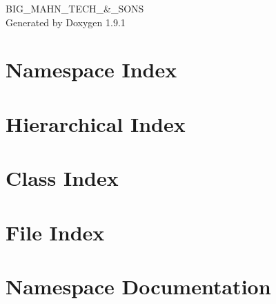 \let\mypdfximage\pdfximage\def\pdfximage{\immediate\mypdfximage}\documentclass[twoside]{book}
\newcommand{\+}{\discretionary{\mbox{\scriptsize$\hookleftarrow$}}{}{}}
\newcommand{\clearemptydoublepage}{%
  \newpage{\pagestyle{empty}\cleardoublepage}%
}
\begin{document}
\raggedbottom

\hypersetup{pageanchor=false,
             bookmarksnumbered=true,
             pdfencoding=unicode
            }
\begin{titlepage}
\vspace*{7cm}
\begin{center}%
{\Large BIG\+\_\+\+MAHN\+\_\+\+TECH\+\_\+\&\+\_\+\+SONS }\\
\vspace*{1cm}
{\large Generated by Doxygen 1.9.1}\\
\end{center}
\end{titlepage}
\clearemptydoublepage
{}
\tableofcontents
\clearemptydoublepage
{}
\hypersetup{pageanchor=true}

\chapter{Namespace Index}

\chapter{Hierarchical Index}

\chapter{Class Index}

\chapter{File Index}

\chapter{Namespace Documentation}










\end{document}
